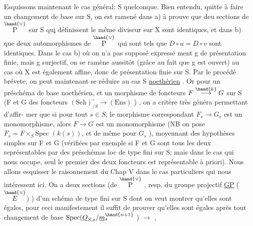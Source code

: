 Esquissons maintenant le cas général: S quelconque.  Bien entendu,
quitte à faire un changement de base sur S, on est ramené dans a) à prouve
que deu sections  de $\overset{\hand{\vee}}{\mathrm{P}}$ sur S  qu\uline{i} définissent le même diviseur sur X sont
identiques, et dans b) que deux automorphismes  de $\overset{\hand{\vee}}{\mathrm{P}}$  qui sont tels que
$D\circ u = D\circ v$  sont identiques.  Dans le cas b) où on n'a pas supposé expressé%
ment  g de présentation finie, mais g surjectif, on se ramène aussitôt
(grâce au fait que g est ouvert) au cas où X est également affine, donc
de présentation finie sur S.  Par le procédé brévete, on peut maintenant
se réduire au cas S \uline{noethérien} .  Or pour un préschéma de base  noethérien,
et un morphisme de foncteurs  $F \overset{\hand{h}}{\longrightarrow} G$ sur S  (F et G des foncteurs
$(\mathrm{Sch})_{/S}^{\circ} \longrightarrow (\mathrm{Ens})$ ) ,  on a  critère très généra  permettant d'affir-%
mer que si  pour tout  $s \in S$, le morphisme correspondant $F_s \longrightarrow G_s$ est
un monomorphisme, alors $F \longrightarrow G$ est un monomorphisme  (NB on pose $F_s{=}F\times_S\mathrm{Spec}$
$(k(s))$, et de même pour $G_s$ ),  moyennant des hypothèses simples sur F et G
(vérifiées par exemple si F et G sont tous les deux représentables par des
préschémas loc de type fini sur S; mais dans le cas qui nous occupe, seul
le premier des deux foncteurs est représentable à priori).  Nous allons
esquisser le raisonnement du Chap V  dans le  cas particuliers qui nous
intéressent ici.  On a deux sections  (de $\overset{\hand{\vee}}{\mathrm{P}}$ , resp. du groupe projectif
\uline{GP} ($\overset{\hand{\vee}}{E}$) ) d'un schéma de type fini  sur S dont on veut montrer qu'elles
sont égales, pour ceci manifestement il suffit de prouver qu'elles sont
égales après tout changement de base  $\mathrm{Spec}(\underline{O}_{S,s}/\underline{m}_s^{\hand{n+1}}$ ) $\longrightarrow$ ,

